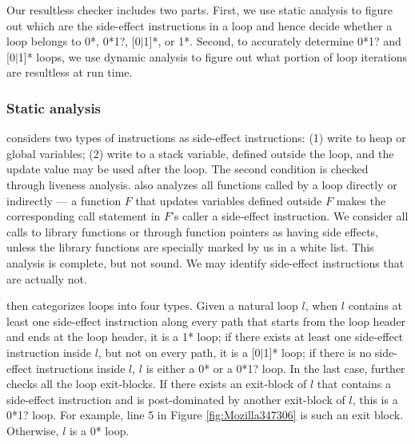 Our resultless checker includes two parts. First, we use static analysis
to figure out which are the side-effect instructions in a loop and hence
decide whether a loop belongs to 0*, 0*1?, [0$|$1]*, or 1*. Second, to
accurately determine 0*1? and [0$|$1]* loops, we use
dynamic analysis to figure out what portion of loop iterations are
resultless at run time.


\subsubsection{Static analysis}
\label{sec:s_workless}

\Tool considers two types of instructions as side-effect instructions:
(1) write to heap or global variables;
(2) write to a stack variable, defined outside the loop, and the update value
may be used after the loop. The second condition is checked through liveness
analysis.
\Tool also analyzes all functions called
by a loop directly or indirectly --- a function $F$ that updates variables
defined outside $F$ makes the corresponding call statement in $F$'s
caller a side-effect instruction.
We consider all calls to library functions or through function pointers 
as having side effects, 
unless the library functions are specially marked by us in a white list.
This analysis is complete, but not sound. We may identify side-effect
instructions that are actually not.  

\Tool then categorizes loops into four types.
Given a natural loop $l$, when $l$
contains at least one side-effect instruction along every path that
starts from the loop header and ends at the loop header, it is a 1* loop;
if there exists at least one side-effect instruction inside $l$, but not on
every path,
it is a [0$|$1]* loop; if there is no side-effect instructions inside $l$,
$l$ is either a 0* or a 0*1? loop.
In the last case, \Tool further checks all the loop exit-blocks. If there 
exists an exit-block of $l$ that contains a side-effect instruction and is  
post-dominated by another exit-block of $l$, this is a 0*1? loop.
For example, line 5 in Figure \ref{fig:Mozilla347306} is such an exit block.
Otherwise, $l$ is a 0* loop.

